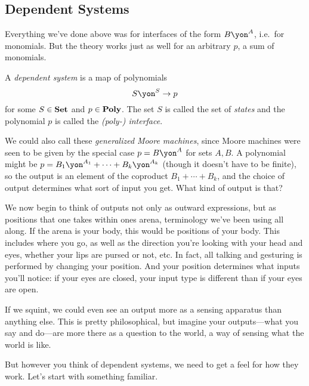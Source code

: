 \documentclass[Book-Poly]{subfiles}
\begin{document}
\subsection{Dependent Systems}

Everything we've done above was for interfaces of the form $B\yon^A$, i.e.\ for monomials. But the theory works just as well for an arbitrary $p$, a sum of monomials.

\begin{definition}\label{def.gen_moore}
A \emph{dependent system} is a map of polynomials
\[S\yon^S\to p\]
for some $S\in\textbf{Set}$ and $p\in\textbf{Poly}$. The set $S$ is called the set of \emph{states} and the polynomial $p$ is called the \emph{(poly-) interface}.
\end{definition}

We could also call these \emph{generalized Moore machines}, since Moore machines were seen to be given by the special case $p=B\yon^A$ for sets $A,B$. A polynomial might be $p=B_1\yon^{A_1}+\cdots+B_k\yon^{A_k}$ (though it doesn't have to be finite), so the output is an element of the coproduct $B_1+\cdots+B_k$, and the choice of output determines what sort of input you get. What kind of output is that?

We now begin to think of outputs not only as outward expressions, but as positions that one takes within ones arena, terminology we've been using all along. If the arena is your body, this would be positions of your body. This includes where you go, as well as the direction you're looking with your head and eyes, whether your lips are pursed or not, etc. In fact, all talking and gesturing is performed by changing your position. And your position determines what inputs you'll notice: if your eyes are closed, your input type is different than if your eyes are open.


If we squint, we could even see an output more as a sensing apparatus than anything else. This is pretty philosophical, but imagine your outputs---what you say and do---are more there as a question to the world, a way of sensing what the world is like.

But however you think of dependent systems, we need to get a feel for how they work. Let's start with something familiar.
\end{document}
